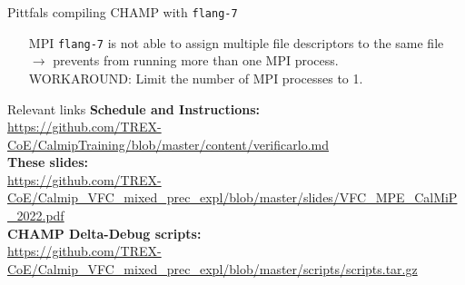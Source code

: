 \documentclass[aspectratio=169]{beamer}
\begin{document}
    \begin{frame}{Pittfals compiling CHAMP with \texttt{flang-7}}
      \begin{itemize}
        \item[MPI] \texttt{flang-7} is not able to assign multiple file descriptors to the same file $\longrightarrow$ prevents from running more than one MPI process.\\
        \vspace{2em}
        WORKAROUND: Limit the number of MPI processes to 1.
      \end{itemize}
      
    
    \end{frame}
    
    
    \begin{frame}{Relevant links}
      \textbf{Schedule and Instructions:}\\
      \url{https://github.com/TREX-CoE/CalmipTraining/blob/master/content/verificarlo.md}\\
      
      \textbf{These slides:}\\
      \url{https://github.com/TREX-CoE/Calmip_VFC_mixed_prec_expl/blob/master/slides/VFC_MPE_CalMiP_2022.pdf}\\
      
      \textbf{CHAMP Delta-Debug scripts:}\\
      \url{https://github.com/TREX-CoE/Calmip_VFC_mixed_prec_expl/blob/master/scripts/scripts.tar.gz}
    \end{frame}
  
\end{document}
